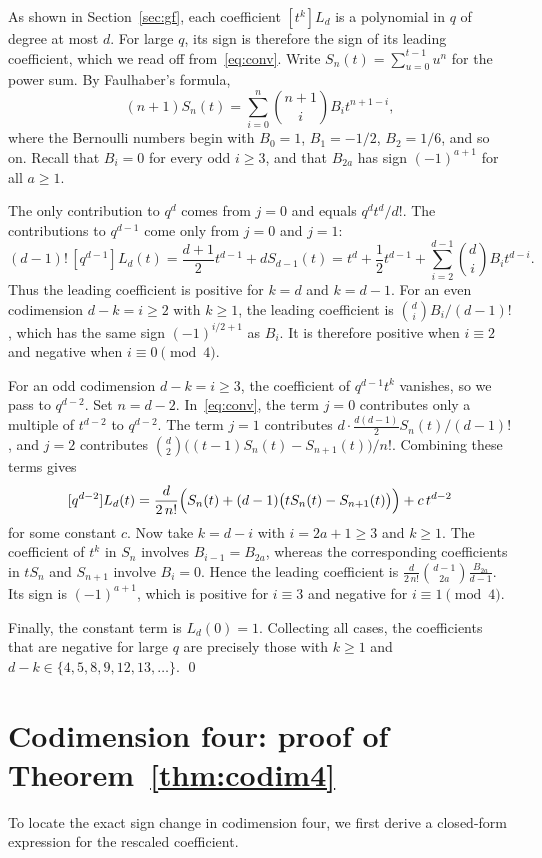 \documentclass[11pt]{amsart}
\theoremstyle{remark}
\begin{document}
As shown in Section~\ref{sec:gf}, each coefficient $[t^k]L_d$ is a polynomial
in $q$ of degree at most $d$. For large $q$, its sign is therefore the sign of
its leading coefficient, which we read off from~\eqref{eq:conv}. Write
$S_n(t)=\sum_{u=0}^{t-1}u^n$ for the power sum. By Faulhaber's formula,
\[
 (n+1)S_n(t)=\sum_{i=0}^{n}\binom{n+1}{i}B_it^{n+1-i},
\]
where the Bernoulli numbers begin with $B_0=1$, $B_1=-1/2$, $B_2=1/6$, and so
on. Recall that $B_i=0$ for every odd $i\ge3$, and that $B_{2a}$ has sign
$(-1)^{a+1}$ for all $a\ge1$.

The only contribution to $q^d$ comes from $j=0$ and equals $q^dt^d/d!$. The
contributions to $q^{d-1}$ come only from $j=0$ and $j=1$:
\[
 (d-1)!\,[q^{d-1}]L_d(t)=\frac{d+1}2t^{d-1}+dS_{d-1}(t)
 =t^d+\frac12t^{d-1}+\sum_{i=2}^{d-1}\binom diB_it^{d-i}.
\]
Thus the leading coefficient is positive for $k=d$ and $k=d-1$. For an even
codimension $d-k=i\ge2$ with $k\ge1$, the leading coefficient is
$\binom diB_i/(d-1)!$, which has the same sign $(-1)^{i/2+1}$ as $B_i$. It is
therefore positive when $i\equiv2$ and negative when $i\equiv0\pmod 4$.

For an odd codimension $d-k=i\ge3$, the coefficient of $q^{d-1}t^k$ vanishes,
so we pass to $q^{d-2}$. Set $n=d-2$. In~\eqref{eq:conv}, the term $j=0$
contributes only a multiple of $t^{d-2}$ to $q^{d-2}$. The term $j=1$
contributes $d\cdot\frac{d(d-1)}{2}S_n(t)/(d-1)!$, and $j=2$ contributes
$\binom d2\bigl((t-1)S_n(t)-S_{n+1}(t)\bigr)/n!$. Combining these terms gives
\[
 [q^{d-2}]L_d(t)=\frac{d}{2\,n!}\Bigl(S_n(t)+(d-1)\bigl(tS_n(t)-S_{n+1}(t)\bigr)\Bigr)
 +c\,t^{d-2}
\]
for some constant $c$. Now take $k=d-i$ with $i=2a+1\ge3$ and $k\ge1$. The
coefficient of $t^k$ in $S_n$ involves $B_{i-1}=B_{2a}$, whereas the
corresponding coefficients in $tS_n$ and $S_{n+1}$ involve $B_i=0$. Hence the
leading coefficient is $\frac{d}{2\,n!}\binom{d-1}{2a}\frac{B_{2a}}{d-1}$. Its
sign is $(-1)^{a+1}$, which is positive for $i\equiv3$ and negative for
$i\equiv1\pmod4$.

Finally, the constant term is $L_d(0)=1$. Collecting all cases, the
coefficients that are negative for large $q$ are precisely those with $k\ge1$
and $d-k\in\{4,5,8,9,12,13,\ldots\}$. \qed

\section{Codimension four: proof of Theorem~\ref{thm:codim4}}\label{sec:codim4}

To locate the exact sign change in codimension four, we first derive a
closed-form expression for the rescaled coefficient.
\end{document}
